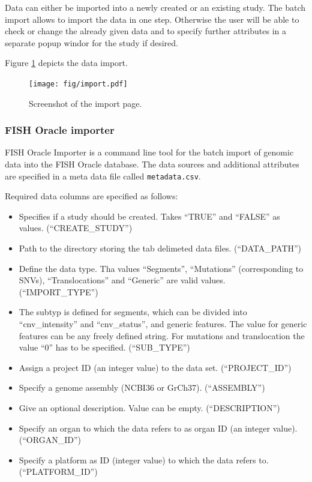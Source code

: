 \documentclass[11pt,final]{article}
\begin{document}
Data can either be imported into a newly created or an existing study. 
The batch import allows to import the data in one step. Otherwise the
user will be able to check or change the already given data and to
specify further attributes in a separate popup windor for the study
if desired.

Figure \ref{fig:import} depicts the data import.

\begin{figure}[h]
	\begin{center}
	  \texttt{[image: fig/import.pdf]}
	\end{center}
	\caption{Screenshot of the import page.}
	\label{fig:import}
\end{figure}

\subsubsection{FISH Oracle importer}

FISH Oracle Importer is a command line tool for the batch import of genomic
data into the FISH Oracle database. The data sources and additional attributes
are specified in a meta data file called \texttt{metadata.csv}. 

Required data columns are specified as follows:

\begin{itemize}
  \item Specifies if a study should be created. Takes ``TRUE'' and ``FALSE'' as
    values. (``{CREATE\_STUDY}'')
  \item Path to the directory storing the tab delimeted data files.
        (``DATA\_PATH'')
  \item Define the data type. Tha values ``Segments'', ``Mutations''
        (corresponding to SNVs), ``Translocations'' and ``Generic'' are valid 
	values. (``IMPORT\_TYPE'')
  \item The subtyp is defined for segments, which can be divided into
        ``cnv\_intensity'' and ``cnv\_status'', and generic features. The value
	for generic features can be any freely defined string. For mutations and
	translocation the value ``0'' has to be specified. (``SUB\_TYPE'')
  \item Assign a project ID (an integer value) to the data set.
        (``PROJECT\_ID'')
  \item Specify a genome assembly (NCBI36 or GrCh37). (``ASSEMBLY'')
  \item Give an optional description. Value can be empty. (``DESCRIPTION'')
  \item Specify an organ to which the data refers to as organ ID (an integer
        value). (``ORGAN\_ID'')
  \item Specify a platform as ID (integer value) to which the data refers to.
        (``PLATFORM\_ID'')
\end{itemize}
\end{document}
